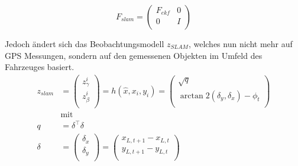 \documentclass[11pt]{article}
\begin{document}
\begin{equation}\label{SLAM-Bewegungsmodell-Jakobi-Matrix}
	F_{slam} = \begin{pmatrix}
		F_{ekf} & 0 \\
		0 & I \\
	\end{pmatrix}
\end{equation}

Jedoch ändert sich das Beobachtungsmodell $z_{SLAM}$, welches nun nicht mehr auf GPS Messungen, sondern auf den gemessenen Objekten im Umfeld des Fahrzeuges basiert.
\begin{equation}\label{SLAM-Observation-Model}
\begin{split}
	z_{slam} &= \begin{pmatrix}
		z_\gamma^i \\
		z_\beta^i \\
	\end{pmatrix} = h(\hat{x}, x_i, y_i) = \begin{pmatrix}
		\sqrt{q} \\
		\arctan 2(\delta_y, \delta_x) - \phi_t \\
	\end{pmatrix}\\
	&\text{mit} \\
	q &= \delta^\intercal \delta \\
	\delta &= \begin{pmatrix}
		\delta_x \\
		\delta_y \\
	\end{pmatrix} = \begin{pmatrix}
		x_{L, t+1} - x_{L, t}  \\
		y_{L, t+1}  - y_{L, t} \\
	\end{pmatrix}
\end{split}
\end{equation}
\end{document}
